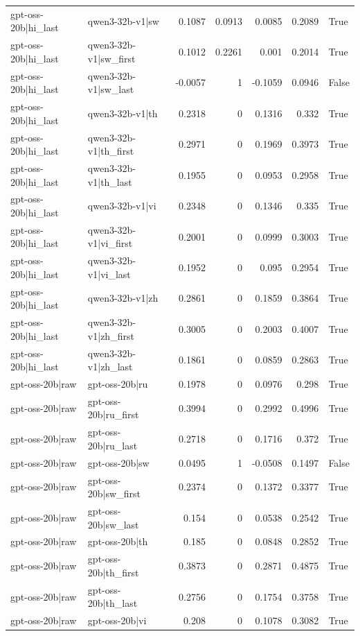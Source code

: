\begin{table}
\begin{tabular}{l l r r r r l}
gpt-oss-20b|hi_last & qwen3-32b-v1|sw & 0.1087 & 0.0913 & 0.0085 & 0.2089 & True \\
gpt-oss-20b|hi_last & qwen3-32b-v1|sw_first & 0.1012 & 0.2261 & 0.001 & 0.2014 & True \\
gpt-oss-20b|hi_last & qwen3-32b-v1|sw_last & -0.0057 & 1 & -0.1059 & 0.0946 & False \\
gpt-oss-20b|hi_last & qwen3-32b-v1|th & 0.2318 & 0 & 0.1316 & 0.332 & True \\
gpt-oss-20b|hi_last & qwen3-32b-v1|th_first & 0.2971 & 0 & 0.1969 & 0.3973 & True \\
gpt-oss-20b|hi_last & qwen3-32b-v1|th_last & 0.1955 & 0 & 0.0953 & 0.2958 & True \\
gpt-oss-20b|hi_last & qwen3-32b-v1|vi & 0.2348 & 0 & 0.1346 & 0.335 & True \\
gpt-oss-20b|hi_last & qwen3-32b-v1|vi_first & 0.2001 & 0 & 0.0999 & 0.3003 & True \\
gpt-oss-20b|hi_last & qwen3-32b-v1|vi_last & 0.1952 & 0 & 0.095 & 0.2954 & True \\
gpt-oss-20b|hi_last & qwen3-32b-v1|zh & 0.2861 & 0 & 0.1859 & 0.3864 & True \\
gpt-oss-20b|hi_last & qwen3-32b-v1|zh_first & 0.3005 & 0 & 0.2003 & 0.4007 & True \\
gpt-oss-20b|hi_last & qwen3-32b-v1|zh_last & 0.1861 & 0 & 0.0859 & 0.2863 & True \\
gpt-oss-20b|raw & gpt-oss-20b|ru & 0.1978 & 0 & 0.0976 & 0.298 & True \\
gpt-oss-20b|raw & gpt-oss-20b|ru_first & 0.3994 & 0 & 0.2992 & 0.4996 & True \\
gpt-oss-20b|raw & gpt-oss-20b|ru_last & 0.2718 & 0 & 0.1716 & 0.372 & True \\
gpt-oss-20b|raw & gpt-oss-20b|sw & 0.0495 & 1 & -0.0508 & 0.1497 & False \\
gpt-oss-20b|raw & gpt-oss-20b|sw_first & 0.2374 & 0 & 0.1372 & 0.3377 & True \\
gpt-oss-20b|raw & gpt-oss-20b|sw_last & 0.154 & 0 & 0.0538 & 0.2542 & True \\
gpt-oss-20b|raw & gpt-oss-20b|th & 0.185 & 0 & 0.0848 & 0.2852 & True \\
gpt-oss-20b|raw & gpt-oss-20b|th_first & 0.3873 & 0 & 0.2871 & 0.4875 & True \\
gpt-oss-20b|raw & gpt-oss-20b|th_last & 0.2756 & 0 & 0.1754 & 0.3758 & True \\
gpt-oss-20b|raw & gpt-oss-20b|vi & 0.208 & 0 & 0.1078 & 0.3082 & True \\

\end{tabular}
\end{table}
